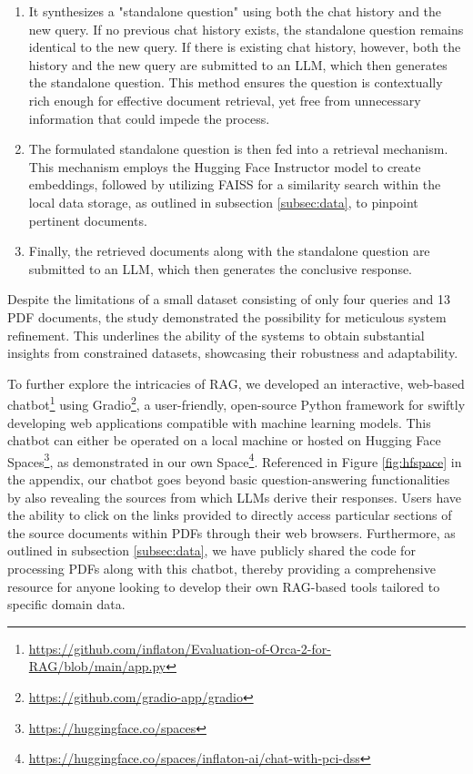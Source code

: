 \documentclass[runningheads]{llncs}
\begin{document}
\begin{enumerate}
    \item It synthesizes a "standalone question" using both the chat history and the new query. If no previous chat history exists, the standalone question remains identical to the new query. If there is existing chat history, however, both the history and the new query are submitted to an LLM, which then generates the standalone question. This method ensures the question is contextually rich enough for effective document retrieval, yet free from unnecessary information that could impede the process.
    \item The formulated standalone question is then fed into a retrieval mechanism. This mechanism employs the Hugging Face Instructor model to create embeddings, followed by utilizing FAISS for a similarity search within the local data storage, as outlined in subsection \ref{subsec:data}, to pinpoint pertinent documents.
    \item Finally, the retrieved documents along with the standalone question are submitted to an LLM, which then generates the conclusive response.
\end{enumerate}

Despite the limitations of a small dataset consisting of only four queries and 13 PDF documents, the study demonstrated the possibility for meticulous system refinement. This underlines the ability of the systems to obtain substantial insights from constrained datasets, showcasing their robustness and adaptability.

To further explore the intricacies of RAG, we developed an interactive, web-based chatbot\footnote{\url{https://github.com/inflaton/Evaluation-of-Orca-2-for-RAG/blob/main/app.py}} using Gradio\footnote{\url{https://github.com/gradio-app/gradio}}, a user-friendly, open-source Python framework for swiftly developing web applications compatible with machine learning models. This chatbot can either be operated on a local machine or hosted on Hugging Face Spaces\footnote{\url{https://huggingface.co/spaces}}, as demonstrated in our own Space\footnote{\url{https://huggingface.co/spaces/inflaton-ai/chat-with-pci-dss}}. Referenced in Figure \ref{fig:hfspace} in the appendix, our chatbot goes beyond basic question-answering functionalities by also revealing the sources from which LLMs derive their responses. Users have the ability to click on the links provided to directly access particular sections of the source documents within PDFs through their web browsers. Furthermore, as outlined in subsection \ref{subsec:data}, we have publicly shared the code for processing PDFs along with this chatbot, thereby providing a comprehensive resource for anyone looking to develop their own RAG-based tools tailored to specific domain data.
\end{document}
